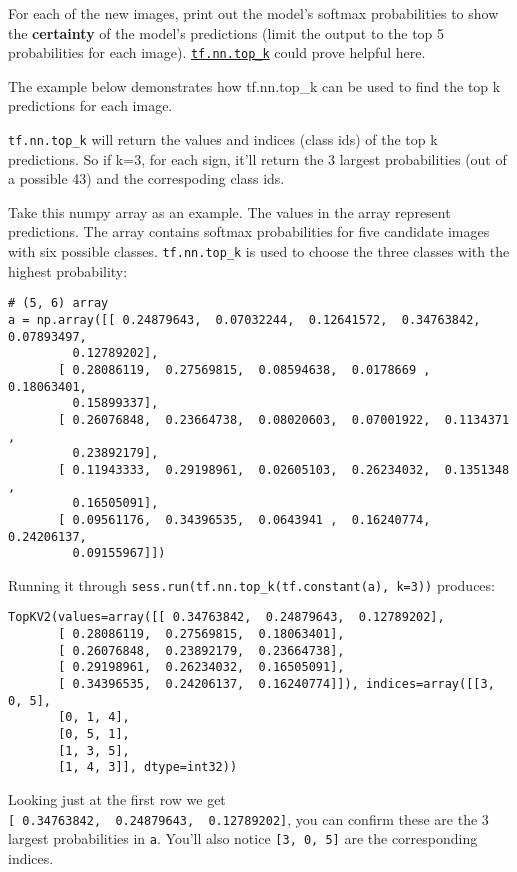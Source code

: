 \documentclass[11pt]{article}
\begin{document}
    For each of the new images, print out the model's softmax probabilities
to show the \textbf{certainty} of the model's predictions (limit the
output to the top 5 probabilities for each image).
\href{https://www.tensorflow.org/versions/r0.12/api_docs/python/nn.html\#top_k}{\texttt{tf.nn.top\_k}}
could prove helpful here.

The example below demonstrates how tf.nn.top\_k can be used to find the
top k predictions for each image.

\texttt{tf.nn.top\_k} will return the values and indices (class ids) of
the top k predictions. So if k=3, for each sign, it'll return the 3
largest probabilities (out of a possible 43) and the correspoding class
ids.

Take this numpy array as an example. The values in the array represent
predictions. The array contains softmax probabilities for five candidate
images with six possible classes. \texttt{tf.nn.top\_k} is used to
choose the three classes with the highest probability:

\begin{verbatim}
# (5, 6) array
a = np.array([[ 0.24879643,  0.07032244,  0.12641572,  0.34763842,  0.07893497,
         0.12789202],
       [ 0.28086119,  0.27569815,  0.08594638,  0.0178669 ,  0.18063401,
         0.15899337],
       [ 0.26076848,  0.23664738,  0.08020603,  0.07001922,  0.1134371 ,
         0.23892179],
       [ 0.11943333,  0.29198961,  0.02605103,  0.26234032,  0.1351348 ,
         0.16505091],
       [ 0.09561176,  0.34396535,  0.0643941 ,  0.16240774,  0.24206137,
         0.09155967]])
\end{verbatim}

Running it through \texttt{sess.run(tf.nn.top\_k(tf.constant(a),\ k=3))}
produces:

\begin{verbatim}
TopKV2(values=array([[ 0.34763842,  0.24879643,  0.12789202],
       [ 0.28086119,  0.27569815,  0.18063401],
       [ 0.26076848,  0.23892179,  0.23664738],
       [ 0.29198961,  0.26234032,  0.16505091],
       [ 0.34396535,  0.24206137,  0.16240774]]), indices=array([[3, 0, 5],
       [0, 1, 4],
       [0, 5, 1],
       [1, 3, 5],
       [1, 4, 3]], dtype=int32))
\end{verbatim}

Looking just at the first row we get
\texttt{{[}\ 0.34763842,\ \ 0.24879643,\ \ 0.12789202{]}}, you can
confirm these are the 3 largest probabilities in \texttt{a}. You'll also
notice \texttt{{[}3,\ 0,\ 5{]}} are the corresponding indices.
\end{document}
